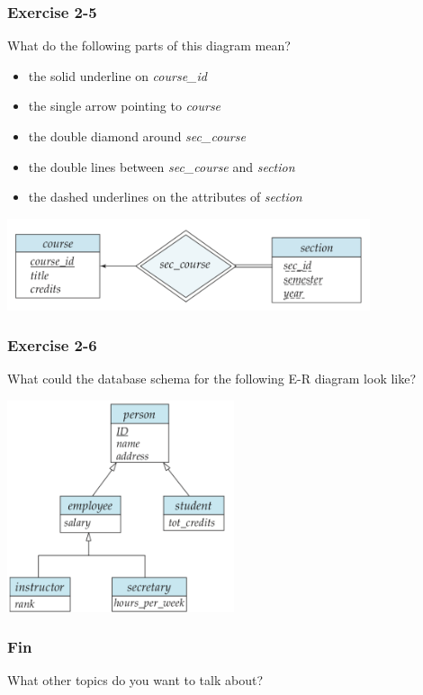 \begin{frame}
\frametitle{Exercise 2-5}

What do the following parts of this diagram mean?

\begin{itemize}
  \item the solid underline on \textit{course\_id}
  \item the single arrow pointing to \textit{course}
  \item the double diamond around \textit{sec\_course}
  \item the double lines between \textit{sec\_course} and \textit{section}
  \item the dashed underlines on the attributes of \textit{section}
\end{itemize}

\begin{center}
  \includegraphics[width=0.8\textwidth]{images/weak-entity-set}
\end{center}

\end{frame}


\begin{frame}
\frametitle{Exercise 2-6}

What could the database schema for the following E-R diagram look like?

\begin{center}
  \includegraphics[width=0.5\textwidth]{images/specialization-generalization}
\end{center}

\end{frame}


\begin{frame}
\frametitle{Fin}

What other topics do you want to talk about?

\end{frame}


